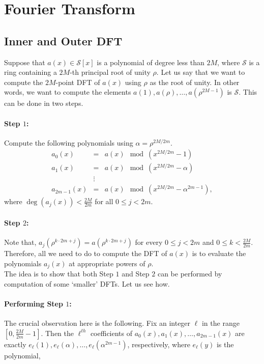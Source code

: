 \documentclass[11pt]{article}
\begin{document}
\section{Fourier Transform}
\subsection{Inner and Outer DFT} \label{sec:inoutDFT}

Suppose that $a(x) \in \mathcal{S}[x]$ is a polynomial of degree less
than $2M$, where $\mathcal{S}$ is a ring containing a $2M$-th principal
root of unity $\rho$. Let us say that we want to compute the
$2M$-point DFT of $a(x)$ using $\rho$ as the root of unity. In other
words, we want to compute the elements $a(1), a(\rho), \ldots,
a(\rho^{2M-1})$ is $\mathcal{S}$. This can be done in two steps.

\paragraph{Step $1$:}
Compute the following polynomials using $\alpha = \rho^{2M/2m}$.
\begin{eqnarray*}
a_0(x) &=& a(x) \mod (x^{2M/2m} - 1) \\
a_1(x) &=& a(x) \mod (x^{2M/2m} - \alpha) \\
			 &\vdots& \\
a_{2m-1}(x) &=& a(x) \mod (x^{2M/2m} - \alpha^{2m-1}),
\end{eqnarray*}
where $\deg(a_j(x)) < \frac{2M}{2m}$ for all $0 \leq j < 2m$.

\paragraph{Step $2$:}
Note that, $a_j(\rho^{k \cdot 2m + j}) = a(\rho^{k \cdot 2m + j})$ for
every $0 \leq j < 2m$ and $0 \leq k < \frac{2M}{2m}$. Therefore, all
we need to do to compute the DFT of $a(x)$ is to evaluate the
polynomials $a_j(x)$ at appropriate powers of $\rho$.\\

\noindent The idea is to show that both Step $1$ and Step $2$ can be
performed by computation of some `smaller' DFTs. Let us see how.

\paragraph{Performing Step $1$:}
The crucial observation here is the following. Fix an integer $\ell$
in the range $[0, \frac{2M}{2m} - 1]$. Then the $\ell^{th}$
coefficients of $a_0(x), a_1(x), \ldots, a_{2m-1}(x)$ are exactly
$e_\ell(1), e_\ell(\alpha), \ldots, e_\ell(\alpha^{2m-1})$,
respectively, where $e_\ell(y)$ is the polynomial,
\end{document}
